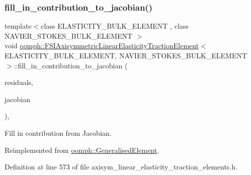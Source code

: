 \subsubsection{\texorpdfstring{fill\+\_\+in\+\_\+contribution\+\_\+to\+\_\+jacobian()}{fill\_in\_contribution\_to\_jacobian()}}
{\footnotesize\ttfamily template$<$class E\+L\+A\+S\+T\+I\+C\+I\+T\+Y\+\_\+\+B\+U\+L\+K\+\_\+\+E\+L\+E\+M\+E\+NT , class N\+A\+V\+I\+E\+R\+\_\+\+S\+T\+O\+K\+E\+S\+\_\+\+B\+U\+L\+K\+\_\+\+E\+L\+E\+M\+E\+NT $>$ \\
void \hyperlink{classoomph_1_1FSIAxisymmetricLinearElasticityTractionElement}{oomph\+::\+F\+S\+I\+Axisymmetric\+Linear\+Elasticity\+Traction\+Element}$<$ E\+L\+A\+S\+T\+I\+C\+I\+T\+Y\+\_\+\+B\+U\+L\+K\+\_\+\+E\+L\+E\+M\+E\+NT, N\+A\+V\+I\+E\+R\+\_\+\+S\+T\+O\+K\+E\+S\+\_\+\+B\+U\+L\+K\+\_\+\+E\+L\+E\+M\+E\+NT $>$\+::fill\+\_\+in\+\_\+contribution\+\_\+to\+\_\+jacobian (\begin{DoxyParamCaption}\item[{\hyperlink{classoomph_1_1Vector}{Vector}$<$ double $>$ \&}]{residuals,  }\item[{\hyperlink{classoomph_1_1DenseMatrix}{Dense\+Matrix}$<$ double $>$ \&}]{jacobian }\end{DoxyParamCaption})\hspace{0.3cm}{\ttfamily [inline]}, {\ttfamily [virtual]}}



Fill in contribution from Jacobian. 



Reimplemented from \hyperlink{classoomph_1_1GeneralisedElement_a6ae09fc0d68e4309ac1b03583d252845}{oomph\+::\+Generalised\+Element}.



Definition at line 573 of file axisym\+\_\+linear\+\_\+elasticity\+\_\+traction\+\_\+elements.\+h.

\mbox{\label{classoomph_1_1FSIAxisymmetricLinearElasticityTractionElement_a1b263d681ce9db54b6439eec04a60080}} 
